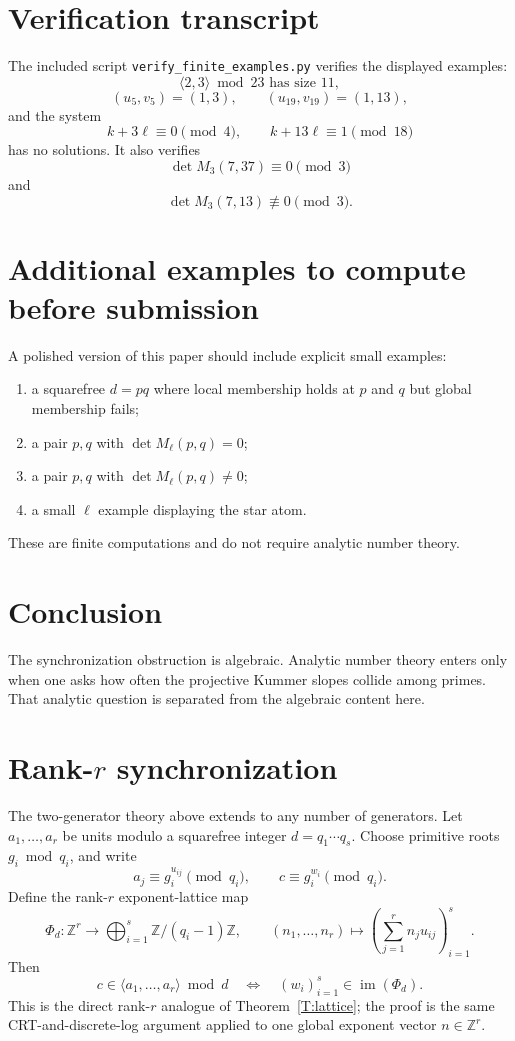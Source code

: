 \documentclass[11pt]{article}
\newcommand{\Z}{\mathbb Z}
\newcommand{\1}{\mathbf 1}
\newcommand{\im}{\operatorname{im}}
\begin{document}
\section{Verification transcript}

The included script \texttt{verify\_finite\_examples.py} verifies the displayed examples:
\[
\langle2,3\rangle\bmod23\text{ has size }11,
\]
\[
(u_5,v_5)=(1,3),\qquad (u_{19},v_{19})=(1,13),
\]
and the system
\[
k+3\ell\equiv0\pmod4,\qquad k+13\ell\equiv1\pmod{18}
\]
has no solutions. It also verifies
\[
\det M_3(7,37)\equiv0\pmod3
\]
and
\[
\det M_3(7,13)\not\equiv0\pmod3.
\]


\section{Additional examples to compute before submission}

A polished version of this paper should include explicit small examples:
\begin{enumerate}[leftmargin=1.5em]
\item a squarefree \(d=pq\) where local membership holds at \(p\) and \(q\) but global membership fails;
\item a pair \(p,q\) with \(\det M_\ell(p,q)=0\);
\item a pair \(p,q\) with \(\det M_\ell(p,q)\ne0\);
\item a small \(\ell\) example displaying the star atom.
\end{enumerate}
These are finite computations and do not require analytic number theory.

\section{Conclusion}

The synchronization obstruction is algebraic.  Analytic number theory enters only when one asks how often the projective Kummer slopes collide among primes.  That analytic question is separated from the algebraic content here.

\section{Rank-\(r\) synchronization}\label{S:rank-r}

The two-generator theory above extends to any number of generators.  Let \(a_1,\ldots,a_r\) be units modulo a squarefree integer \(d=q_1\cdots q_s\).  Choose primitive roots \(g_i\bmod q_i\), and write
\[
a_j\equiv g_i^{u_{ij}}\pmod{q_i},\qquad c\equiv g_i^{w_i}\pmod{q_i}.
\]
Define the rank-\(r\) exponent-lattice map
\[
\Phi_d:\Z^r\longrightarrow\bigoplus_{i=1}^s\Z/(q_i-1)\Z,
\qquad
(n_1,\ldots,n_r)\longmapsto
\left(\sum_{j=1}^r n_j u_{ij}\right)_{i=1}^s.
\]
Then
\[
c\in\langle a_1,\ldots,a_r\rangle\bmod d
\quad\Longleftrightarrow\quad
(w_i)_{i=1}^s\in\im(\Phi_d).
\]
This is the direct rank-\(r\) analogue of Theorem~\ref{T:lattice}; the proof is the same CRT-and-discrete-log argument applied to one global exponent vector \(n\in\Z^r\).
\end{document}
